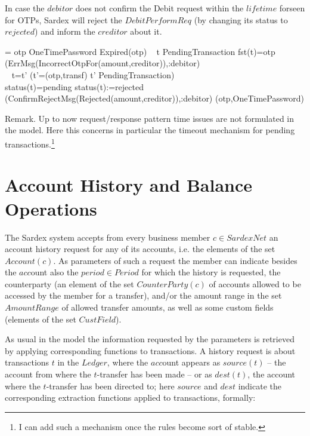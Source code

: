 In case the $debitor$ does not confirm the Debit request 
within the $lifetime$ forseen for OTPs,
Sardex will reject the $DebitPerformReq$ (by changing its status to $rejected$) and inform the $creditor$ about it.

\begin{asm}  
  =\+           
\IF otp \in OneTimePassword \AND Expired(otp)  \THEN \+ 
\IF ~ \THEREISNO t \in PendingTransaction \WITH fst(t)=otp\+
     \THEN  ~ (ErrMsg(IncorrectOtpFor(amount,creditor)),\TO :debitor) \\
  \ELSE ~\+
     \LET t=\iota t' (t'=(otp,transf) \mid t'  \in PendingTransaction)\\
     \IF status(t)=pending \THEN \+
          status(t):=rejected\\
          (ConfirmRejectMsg(Rejected(amount,creditor)),\TO :debitor)
                          \dec\dec\-
     (otp,OneTimePassword)     
\end{asm}




Remark. Up to now request/response pattern time issues are not formulated in the model. Here this concerns in particular the  timeout mechanism for pending transactions.\footnote{I can add such a mechanism once the rules become sort of stable.}

\section{Account History and Balance Operations}
\label{sect:accHistory}

The Sardex system accepts from every business member $c \in SardexNet$ an account history request for any of its accounts, i.e. the elements of  the set $Account(c)$. As parameters of such a request the member can indicate besides the $acc$ount also 
the $period \in Period$ for which the history is requested, the counterparty (an 
element of the set $CounterParty(c)$  of accounts allowed to be accessed by the 
member for a transfer), and/or the amount range in the set $AmountRange$ of allowed 
transfer amounts, as well as some custom fields (elements of the set $CustField$).



As usual in the model the information requested by the parameters is retrieved by applying corresponding functions to transactions. A  history request is about transactions $t$ in the $Ledger$, where the $acc$ount appears as $source(t)$ -- the account from where the $t$-transfer has been made -- or as $dest(t)$, the account where the $t$-transfer has been directed to; here $source$ and $dest$ 
indicate the corresponding extraction functions applied to transactions, formally:

